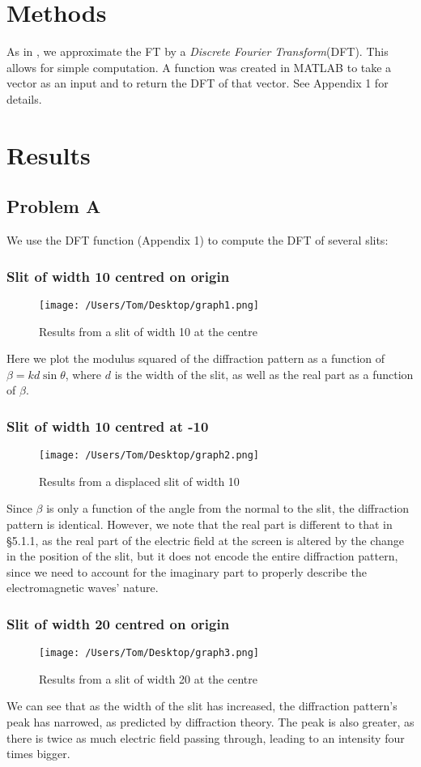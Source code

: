 \documentclass[a4paper,11pt]{article}
\begin{document}
\section{Methods}
As in \cite{script}, we approximate the FT by a \textit{Discrete Fourier Transform}(DFT). This allows for simple computation. A function was created in MATLAB to take a vector as an input and to return the DFT of that vector. See Appendix 1 for details. 
\section{Results}
\subsection{Problem A}
We use the DFT function (Appendix 1) to compute the DFT of several slits:
\subsubsection{Slit of width 10 centred on origin}
\begin{figure}[h]
  \texttt{[image: /Users/Tom/Desktop/graph1.png]}
  \caption{Results from a slit of width 10 at the centre}
  \label{fig:graph1}
\end{figure}
\noindent Here we plot the modulus squared of the diffraction pattern as a function of $\beta = kd\sin\theta$, where $d$ is the width of the slit, as well as the real part as a function of $\beta$. 
\pagebreak
\subsubsection{Slit of width 10 centred at -10}
\begin{figure}[h]
  \texttt{[image: /Users/Tom/Desktop/graph2.png]}
  \caption{Results from a displaced slit of width 10}
  \label{fig:graph2}
\end{figure}
Since $\beta$ is only a function of the angle from the normal to the slit, the diffraction pattern is identical. However, we note that the real part is different to that in \S5.1.1, as the real part of the electric field at the screen is altered by the change in the position of the slit, but it does not encode the entire diffraction pattern, since we need to account for the imaginary part to properly describe the electromagnetic waves' nature.
\subsubsection{Slit of width 20 centred on origin}
\begin{figure}[h]
  \texttt{[image: /Users/Tom/Desktop/graph3.png]}
  \caption{Results from a slit of width 20 at the centre}
  \label{fig:graph1}
\end{figure}
We can see that as the width of the slit has increased, the diffraction pattern's peak has narrowed, as predicted by diffraction theory. The peak is also greater, as there is twice as much electric field passing through, leading to an intensity four times bigger.
\end{document}
